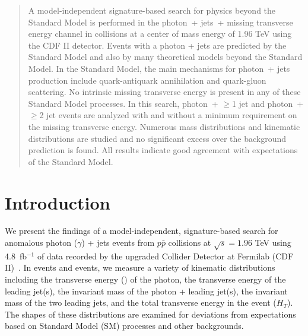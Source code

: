 \documentclass[12pt,twoside,letterpaper,doublespace]{article}
\begin{document}

\maketitle

%
\begin{abstract}
A model-independent signature-based search for physics beyond the Standard Model is performed in the photon~+ jets~+ missing transverse energy channel in \ppbar collisions at a center of mass energy of 1.96 TeV using the CDF II detector. Events with a photon + jets are predicted by the Standard Model and also by many theoretical models beyond the Standard Model. In the Standard Model, the main mechanisms for photon~+ jets production include quark-antiquark annihilation and quark-gluon scattering. No intrinsic missing transverse energy is present in any of these Standard Model processes. In this search, photon~+ $\geq$1 jet and photon~+ $\geq$2 jet events are analyzed with and without a minimum requirement on the missing transverse energy. Numerous mass distributions and kinematic distributions are studied and no significant excess over the background prediction is found. All results indicate good agreement with expectations of the Standard Model.
\end{abstract}


%
\newpage
\section{Introduction}
We present the findings of a model-independent, signature-based search for anomalous photon ($\gamma$) + jets events from $p\bar{p}$ collisions at $\sqrt{s} = 1.96$ TeV using 4.8~fb$^{-1}$ of data recorded by the upgraded Collider Detector at Fermilab (CDF II)~\cite{ref:CDFDetector}. In \phoonejet events and \photwojet events, we measure a variety of kinematic distributions including the transverse energy (\et) of the photon, the transverse energy of the leading jet(s), the invariant mass of the photon + leading jet(s), the invariant mass of the two leading jets, and the total transverse energy in the event ($H_T$).  The shapes of these distributions are examined for deviations from expectations based on Standard Model (SM) processes and other backgrounds.
\end{document}
